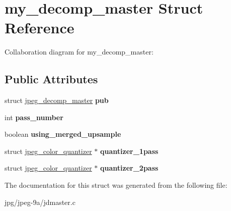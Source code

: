 \hypertarget{structmy__decomp__master}{\section{my\+\_\+decomp\+\_\+master Struct Reference}
\label{structmy__decomp__master}
}


Collaboration diagram for my\+\_\+decomp\+\_\+master\+:
\subsection*{Public Attributes}
\begin{DoxyCompactItemize}
\item 
\hypertarget{structmy__decomp__master_ab9a692c30b5f1cc03d9074ad3c69af3f}{struct \hyperlink{structjpeg__decomp__master}{jpeg\+\_\+decomp\+\_\+master} {\bfseries pub}}\label{structmy__decomp__master_ab9a692c30b5f1cc03d9074ad3c69af3f}

\item 
\hypertarget{structmy__decomp__master_a0870daa393b92584b4720171586074a1}{int {\bfseries pass\+\_\+number}}\label{structmy__decomp__master_a0870daa393b92584b4720171586074a1}

\item 
\hypertarget{structmy__decomp__master_af7ab207dfbf091b4de60e6fe3938f4a4}{boolean {\bfseries using\+\_\+merged\+\_\+upsample}}\label{structmy__decomp__master_af7ab207dfbf091b4de60e6fe3938f4a4}

\item 
\hypertarget{structmy__decomp__master_af72048ba84933f931c09153470ff4f0b}{struct \hyperlink{structjpeg__color__quantizer}{jpeg\+\_\+color\+\_\+quantizer} $\ast$ {\bfseries quantizer\+\_\+1pass}}\label{structmy__decomp__master_af72048ba84933f931c09153470ff4f0b}

\item 
\hypertarget{structmy__decomp__master_a9a5f56ccbaec7d13e08e0cfb9d7a3974}{struct \hyperlink{structjpeg__color__quantizer}{jpeg\+\_\+color\+\_\+quantizer} $\ast$ {\bfseries quantizer\+\_\+2pass}}\label{structmy__decomp__master_a9a5f56ccbaec7d13e08e0cfb9d7a3974}

\end{DoxyCompactItemize}


The documentation for this struct was generated from the following file\+:\begin{DoxyCompactItemize}
\item 
jpg/jpeg-\/9a/jdmaster.\+c\end{DoxyCompactItemize}
